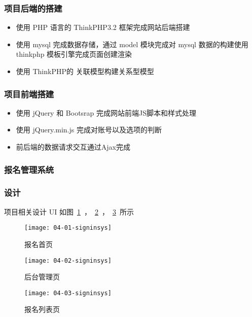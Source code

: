 \subsubsection*{项目后端的搭建}

\begin{itemize}
  \item 使用 PHP 语言的 ThinkPHP3.2 框架完成网站后端搭建
  \item 使用 mysql 完成数据存储，通过 model 模块完成对 mysql 数据的构建使用 thinkphp 模板引擎完成页面创建渲染
  \item 使用 ThinkPHP的 关联模型构建关系型模型
\end{itemize}

\subsubsection*{项目前端搭建}

\begin{itemize}
  \item 使用 jQuery 和 Bootsrap 完成网站前端JS脚本和样式处理
  \item 使用 jQuery.min.js 完成对账号以及选项的判断
  \item 前后端的数据请求交互通过Ajax完成
\end{itemize}

\subsubsection{报名管理系统}
\label{sec:requirements}

\subsubsection*{设计}

项目相关设计 UI 如图~\ref{fig:04-01-signinsys}~，~\ref{fig:04-02-signinsys}~，~\ref{fig:04-03-signinsys}~所示

\begin{figure}[htbp]
\centering
\texttt{[image: 04-01-signinsys]}
\caption{报名首页}
\label{fig:04-01-signinsys}
\end{figure}

\begin{figure}[htbp]
\centering
\texttt{[image: 04-02-signinsys]}
\caption{后台管理页}
\label{fig:04-02-signinsys}
\end{figure}

\begin{figure}[htbp]
\centering
\texttt{[image: 04-03-signinsys]}
\caption{报名列表页}
\label{fig:04-03-signinsys}
\end{figure}

